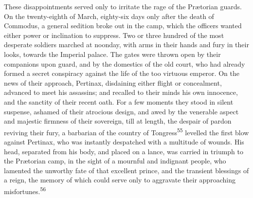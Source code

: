 These disappointments served only to irritate the rage of the
Prætorian guards. On the twenty-eighth of March, eighty-six days
only after the death of Commodus, a general sedition broke out in
the camp, which the officers wanted either power or inclination
to suppress. Two or three hundred of the most desperate soldiers
marched at noonday, with arms in their hands and fury in their
looks, towards the Imperial palace. The gates were thrown open by
their companions upon guard, and by the domestics of the old
court, who had already formed a secret conspiracy against the
life of the too virtuous emperor. On the news of their approach,
Pertinax, disdaining either flight or concealment, advanced to
meet his assassins; and recalled to their minds his own
innocence, and the sanctity of their recent oath. For a few
moments they stood in silent suspense, ashamed of their atrocious
design, and awed by the venerable aspect and majestic firmness of
their sovereign, till at length, the despair of pardon reviving
their fury, a barbarian of the country of Tongress\textsuperscript{55} levelled
the first blow against Pertinax, who was instantly despatched
with a multitude of wounds. His head, separated from his body,
and placed on a lance, was carried in triumph to the Prætorian
camp, in the sight of a mournful and indignant people, who
lamented the unworthy fate of that excellent prince, and the
transient blessings of a reign, the memory of which could serve
only to aggravate their approaching misfortunes.\textsuperscript{56}



